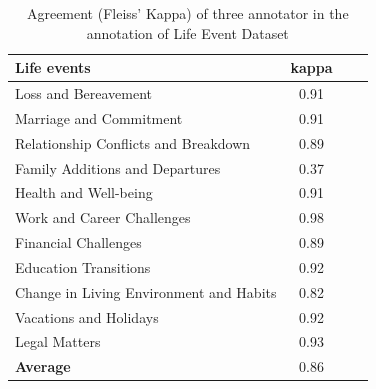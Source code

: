 \begin{table}[th]
    \small
    \centering
    \begin{tabular}{l|ccc}
    \hline
    Life events & kappa  \\ 
    \hline
    Loss and Bereavement  & 0.91 \\ 
    Marriage and Commitment  & 0.91	 \\ 
    Relationship Conflicts and Breakdown  & 0.89	  \\ 
    Family Additions and Departures & 0.37	   \\ 
    Health and Well-being & 0.91	  \\ 
    Work and Career Challenges & 0.98 \\ 
    Financial Challenges & 0.89 \\
   
    Education Transitions & 0.92 \\
    
    Change in Living Environment and Habits & 0.82 \\
    
    Vacations and Holidays & 0.92 \\
    
    Legal Matters & 0.93 \\
    \hline
    \textbf{Average} & 0.86 \\
    \hline
    \end{tabular}
    \caption{Agreement (Fleiss' Kappa) of three annotator in the annotation of Life Event Dataset}
    \label{tab:kappa}
\end{table}


